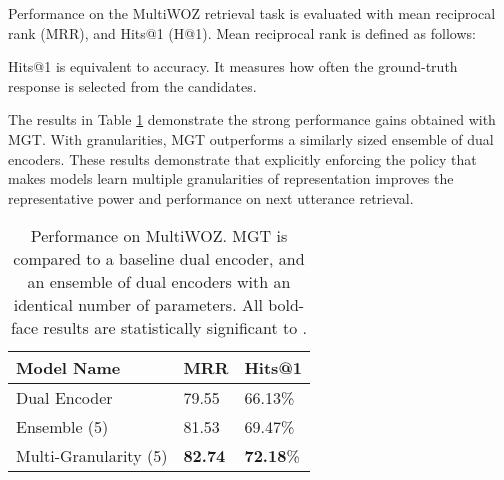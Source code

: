 \documentclass[11pt,a4paper]{article}
\begin{document}
Performance on the MultiWOZ retrieval task is evaluated with mean reciprocal rank (MRR), and Hits@1 (H@1). Mean reciprocal rank is defined as follows:



Hits@1 is equivalent to accuracy. It measures how often the ground-truth response is selected from the  candidates. 

The results in Table \ref{mwoz_results} demonstrate the strong performance gains obtained with MGT. With  granularities, MGT outperforms a similarly sized ensemble of dual encoders. These results demonstrate that explicitly enforcing the policy that makes models learn multiple granularities of representation improves the representative power and performance on next utterance retrieval.


\begin{table}[]
\centering
\begin{tabular}{|l|l|l|}
\hline
\textbf{Model Name}            & \textbf{MRR} & \textbf{Hits@1} \\ \hline
Dual Encoder                   & 79.55        & 66.13\%         \\ 
Ensemble  (5)   & 81.53        & 69.47\%         \\ 
Multi-Granularity (5) & \textbf{82.74}        & \textbf{72.18}\%         \\ \hline
\end{tabular}
\caption{Performance on MultiWOZ. MGT is compared to a baseline dual encoder, and an ensemble of dual encoders with an identical number of parameters. All bold-face results are statistically significant to .}
\label{mwoz_results}
\end{table}
\end{document}
